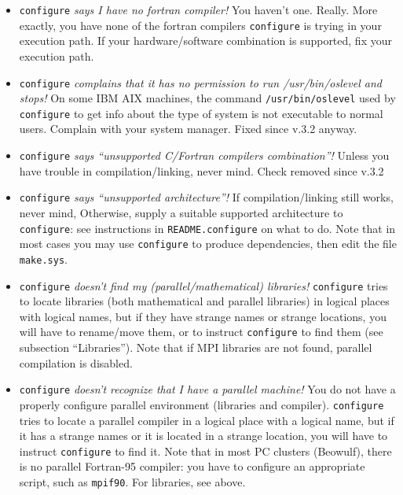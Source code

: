 \documentclass[12pt,a4paper]{article}
\begin{document}
\begin{itemize}

\item {\texttt{configure} \em says I have no fortran compiler!}
You haven't one. Really. More exactly, you have none of the fortran 
compilers \texttt{configure} is trying in your execution path. If 
your hardware/software combination is supported, fix your 
execution path.

\item {\texttt{configure} \em complains that it has no permission 
to run /usr/bin/oslevel and stops!} On some IBM AIX machines, the command
\texttt{/usr/bin/oslevel} used by \texttt{configure} to get info about
the type of system is not executable to normal users. Complain with
your system manager. Fixed since v.3.2 anyway.

\item {\texttt{configure} \em says ``unsupported C/Fortran compilers 
combination''!}
Unless you have trouble in compilation/linking, never mind.
Check removed since v.3.2

\item {\texttt{configure} \em says ``unsupported architecture''!}
If compilation/linking still works, never mind, Otherwise, supply
a suitable supported architecture to \texttt{configure}: see 
instructions in \texttt{README.configure} on what to do. Note that 
in most cases you may use \texttt{configure} to produce dependencies, 
then edit the file \texttt{make.sys}.

\item {\texttt{configure} \em doesn't find my (parallel/mathematical) 
libraries!}
\texttt{configure} tries to locate libraries (both mathematical and 
parallel libraries) in logical places with logical names, but if they 
have strange names or strange locations, you will have to rename/move 
them, or to instruct \texttt{configure} to find them (see subsection 
``Libraries''). Note that if MPI libraries are not found, parallel
compilation is disabled.

\item {\texttt{configure} \em doesn't recognize that I have a parallel 
machine!}
You do not have a properly configure parallel environment (libraries and
compiler). \texttt{configure} tries to locate a parallel compiler in a 
logical place with a logical name, but if it has a strange names or it 
is located in a strange location, you will have to instruct 
\texttt{configure} to find it. Note that in most PC clusters (Beowulf),
there is no parallel Fortran-95 compiler: you have to configure an 
appropriate script, such as \texttt{mpif90}. For libraries, see above.

\end{itemize}
\end{document}
